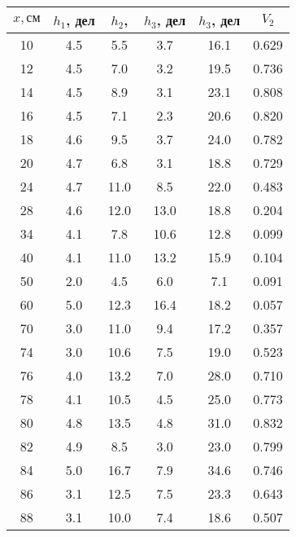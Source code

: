 \begin{tabular}{cccccc}
\toprule
$x, см$ & $h_1$, дел & $h_2$, & $h_3$, дел & $h_3$, дел & $V_2$ \\
\midrule
10 & 4.5 & 5.5  & 3.7  & 16.1 & 0.629 \\
12 & 4.5 & 7.0  & 3.2  & 19.5 & 0.736 \\
14 & 4.5 & 8.9  & 3.1  & 23.1 & 0.808 \\
16 & 4.5 & 7.1  & 2.3  & 20.6 & 0.820 \\
18 & 4.6 & 9.5  & 3.7  & 24.0 & 0.782 \\
20 & 4.7 & 6.8  & 3.1  & 18.8 & 0.729 \\
24 & 4.7 & 11.0 & 8.5  & 22.0 & 0.483 \\
28 & 4.6 & 12.0 & 13.0 & 18.8 & 0.204 \\
34 & 4.1 & 7.8  & 10.6 & 12.8 & 0.099 \\
40 & 4.1 & 11.0 & 13.2 & 15.9 & 0.104 \\
50 & 2.0 & 4.5  & 6.0  & 7.1  & 0.091 \\
60 & 5.0 & 12.3 & 16.4 & 18.2 & 0.057 \\
70 & 3.0 & 11.0 & 9.4  & 17.2 & 0.357 \\
74 & 3.0 & 10.6 & 7.5  & 19.0 & 0.523 \\
76 & 4.0 & 13.2 & 7.0  & 28.0 & 0.710 \\
78 & 4.1 & 10.5 & 4.5  & 25.0 & 0.773 \\
80 & 4.8 & 13.5 & 4.8  & 31.0 & 0.832 \\
82 & 4.9 & 8.5  & 3.0  & 23.0 & 0.799 \\
84 & 5.0 & 16.7 & 7.9  & 34.6 & 0.746 \\
86 & 3.1 & 12.5 & 7.5  & 23.3 & 0.643 \\
88 & 3.1 & 10.0 & 7.4  & 18.6 & 0.507 \\
\bottomrule
\end{tabular}
